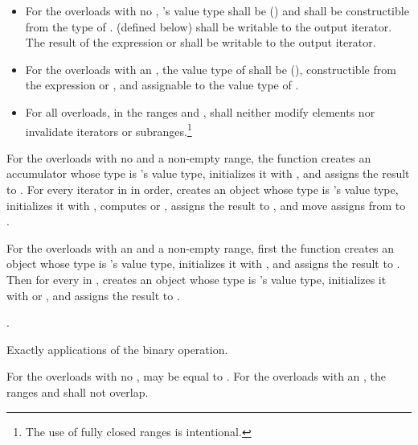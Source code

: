 \begin{itemdescr}
\pnum
\requires
\begin{itemize}
\item
For the overloads with no , 's value
type shall be  () and shall
be constructible from the type of .  (defined below)
shall be writable to the 
output iterator.  The result of the expression  or
 shall be writable to the  output iterator.

\item
For the overloads with an , the value type of
shall be  (),
constructible from the expression  or
, and assignable to the value type of
.

\item
For all overloads, in the ranges
and
,
shall neither modify elements nor invalidate iterators or
subranges.\footnote{The use of fully closed ranges is intentional.}
\end{itemize}

\pnum
\effects For the overloads with no  and a non-empty range,
the function creates an accumulator  whose type is 's
value type, initializes it with ,
and assigns the result to . For every iterator  in 
in order, creates an object  whose type is 's value type, initializes it
with , computes  or , assigns the result
to , and move assigns from  to .

\pnum
For the overloads with an  and a non-empty range, first the
function creates an object whose type is 's value type,
initializes it with , and assigns the result to .
Then for every 
in , creates an object  whose type is
's value type, initializes it with
 or
, and assigns the result to
.

\pnum
\returns
{}.

\pnum
\complexity
Exactly
applications of
the binary operation.

\pnum
\remarks
For the overloads with no ,  may be equal
to .  For the overloads with an , the ranges
 and  shall not overlap.
\end{itemdescr}

